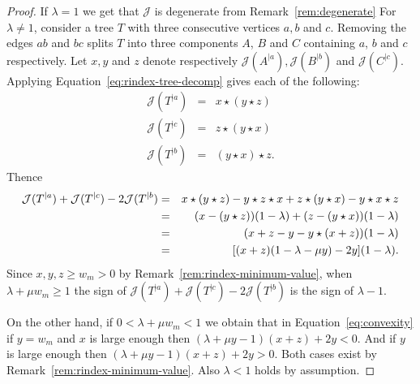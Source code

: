 \documentclass[11 pt]{modarticle}
\newcommand{\wmin}{w_m}
\newcommand{\rtree}[2]{{#1}^{\lvert #2}}
\newcommand{\rindexsymbol}{\mathcal{J}}
\newcommand{\rindex}[2]{\rindexsymbol(\rtree{#2}{#1})}
\begin{document}
\begin{proof}
If $\lambda = 1$ we get that $\rindexsymbol$ is degenerate from Remark~\ref{rem:degenerate} %
For $\lambda \neq 1$, consider a tree $T$ with three consecutive vertices $a,b$ and $c$. Removing the edges $ab$ and $bc$ splits $T$ into three components $A$, $B$ and $C$ containing $a$, $b$ and $c$ respectively. Let $x,y$ and $z$ denote respectively $\rindex{a}{A}, \rindex{b}{B}$ and $\rindex{c}{C}$. Applying Equation~\eqref{eq:rindex-tree-decomp} gives each of the following:
\begin{eqnarray*}
	\rindex{a}{T} & = & x \star (y \star z) \\
	\rindex{c}{T} & = & z \star (y \star x) \\
	\rindex{b}{T} & = & (y \star x) \star z.
\end{eqnarray*}
Thence
\begin{eqnarray}
	\rindex{a}{T} + \rindex{c}{T} - 2 \rindex{b}{T} & = & x \star (y \star z) - y \star z \star x +  z \star (y \star x) - y\star x \star z \notag \\  
	& = & (x - (y\star z))(1 - \lambda) + (z - (y \star x))(1 - \lambda) \notag \\
	& = & (x + z - y - y \star (x + z)) (1 - \lambda) \notag\\
	& = & [(x + z)(1 - \lambda - \mu y) - 2y] (1 - \lambda). \label{eq:convexity}
\end{eqnarray}
Since $x,y,z \geq \wmin > 0$ by Remark~\ref{rem:rindex-minimum-value}, when $\lambda + \mu \wmin \geq 1$ the sign of $\rindex{a}{T} + \rindex{c}{T} - 2 \rindex{b}{T}$ is the sign of $\lambda - 1$.

On the other hand, if $0 < \lambda + \mu \wmin < 1$ we obtain that in Equation~\eqref{eq:convexity} if $y = \wmin$ and $x$ is large enough then $(\lambda + \mu y - 1)(x+z) + 2y < 0$. And if $y$ is large enough then $(\lambda + \mu y - 1)(x+z) + 2y > 0$. Both cases exist by Remark~\ref{rem:rindex-minimum-value}. Also $\lambda < 1$ holds by assumption.
\end{proof}
\end{document}
